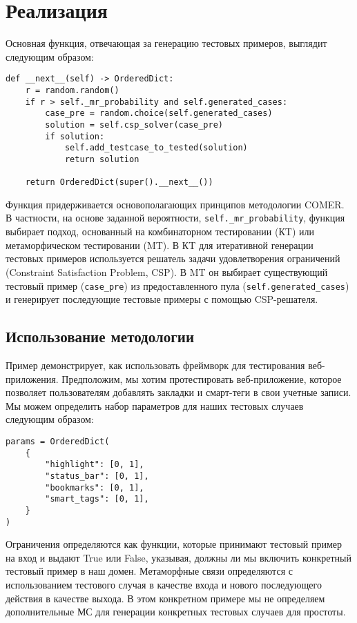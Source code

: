\chapter{Реализация}
\label{chap:impl}

Основная функция, отвечающая за генерацию тестовых примеров, выглядит следующим образом:

\begin{lstlisting}[label={lst:test-case1}]
def __next__(self) -> OrderedDict:
	r = random.random()
	if r > self._mr_probability and self.generated_cases:
		case_pre = random.choice(self.generated_cases)
		solution = self.csp_solver(case_pre)
		if solution:
			self.add_testcase_to_tested(solution)
			return solution

	return OrderedDict(super().__next__())

\end{lstlisting}

Функция придерживается основополагающих принципов методологии COMER.
В частности, на основе заданной вероятности, \verb|self._mr_probability|, функция выбирает подход, основанный на комбинаторном тестировании (КT) или метаморфическом тестировании (MT).
В КT для итеративной генерации тестовых примеров используется решатель задачи удовлетворения ограничений (Constraint Satisfaction Problem, CSP).
В MT он выбирает существующий тестовый пример (\verb|case_pre|) из предоставленного пула (\verb|self.generated_cases|) и генерирует последующие тестовые примеры с помощью CSP-решателя.

\section{Использование методологии}

Пример демонстрирует, как использовать фреймворк для тестирования веб-приложения. Предположим, мы хотим протестировать веб-приложение, которое позволяет пользователям добавлять закладки и смарт-теги в свои учетные записи. Мы можем определить набор параметров для наших тестовых случаев следующим образом:

\begin{lstlisting}[label={lst:test-case2}]
params = OrderedDict(
	{
		"highlight": [0, 1],
		"status_bar": [0, 1],
		"bookmarks": [0, 1],
		"smart_tags": [0, 1],
	}
)
\end{lstlisting}

Ограничения определяются как функции, которые принимают тестовый пример на вход и выдают True или False, указывая, должны ли мы включить конкретный тестовый пример в наш домен. Метаморфные связи определяются с использованием тестового случая в качестве входа и нового последующего действия в качестве выхода. В этом конкретном примере мы не определяем дополнительные МС для генерации конкретных тестовых случаев для простоты.

